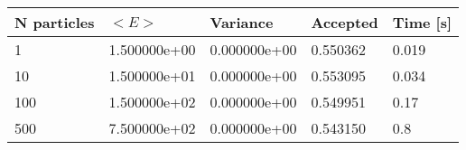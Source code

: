 \begin{table}[h!]
\centering 
\begin{tabular}{|l|l|l|l|l|}
\hline 
N particles & $<E>$ & Variance & Accepted & Time [s]\\ 
 \hline 
1 & 1.500000e+00 & 0.000000e+00 & 0.550362 & 0.019 \\ \hline 
10 & 1.500000e+01 & 0.000000e+00 & 0.553095 & 0.034 \\ \hline 
100 & 1.500000e+02 & 0.000000e+00 & 0.549951 & 0.17 \\ \hline 
500 & 7.500000e+02 & 0.000000e+00 & 0.543150 & 0.8 \\ \hline 
\end{tabular}
\label{tab:ha3} 
\end{table} 
